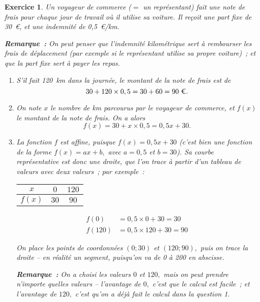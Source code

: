 \documentclass[10pt]{article}
\newtheorem{exo}{Exercice}
\begin{document}
\begin{exo}

Un voyageur de commerce ($=$ un représentant) fait une note de frais pour chaque jour de travail où il utilise sa voiture. Il reçoit une part fixe de 30~\euro, et une indemnité de 0,5~\euro/km.

\medskip

\textbf{Remarque~:} On peut penser que l'indemnité kilométrique sert à rembourser les frais de déplacement (par exemple si le représentant utilise sa propre voiture)~; et que la part fixe sert à payer les repas.

\begin{enumerate}
\item S'il fait 120~km dans la journée, le montant de la note de frais est de \[30+120\times 0,5=30+60=90~\text{\euro}.\]
\item On note $x$ le nombre de km parcourus par le voyageur de commerce, et $f(x)$ le montant de la note de frais. On a alors \[f(x)=30+x\times 0,5=0,5x+30.\]
\item La fonction $f$ est affine, puisque $f(x)=0,5x+30$ (c'est bien une fonction de la forme $f(x)=ax+b,$ avec $a=0,5$ et $b=30$). Sa courbe représentative est donc une droite, que l'on trace à partir d'un tableau de valeurs avec deux valeurs~; par exemple~:

\setlength{\columnseprule}{1pt}

\begin{multicols}{2}
\begin{center}
 \begin{tabular}{|c|c|c|}\hline
$x$& $0$ &$120$ \\ \hline 
$f(x)$&$30$ &$90$  \\ \hline
\end{tabular}
\end{center}

\begin{align*}f(0)&=0,5\times 0+30=30\\
f(120)&=0,5\times 120+30=90\end{align*}

On place les points de coordonnées $(0;30)$ et $(120;90),$ puis on trace la droite -- en réalité un segment, puisqu'on va de 0 à 200 en abscisse.

\end{multicols}

\medskip

\textbf{Remarque~:} On a choisi les valeurs  $0$ et $120,$ mais on peut prendre n'importe quelles valeurs -- l'avantage de $0,$ c'est que le calcul est facile~; et l'avantage de $120,$ c'est qu'on a déjà fait le calcul dans la question 1.


\end{enumerate}
\end{exo}
\end{document}
